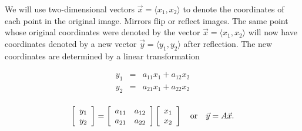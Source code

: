 We will use two-dimensional vectors $\vec x = \langle{x_1, x_2}\rangle$ to denote the coordinates of each point in the original image.  Mirrors flip or reflect images.  The same point whose original coordinates were denoted by the vector $\vec x = \langle{x_1, x_2}\rangle$ will now have coordinates denoted by a new vector $\vec y = \langle{y_1, y_2}\rangle$ after reflection.  
The new coordinates are determined by a linear transformation

\begin{eqnarray*}
y_1 &=& a_{11} x_1 + a_{12} x_2\\
y_2 &=& a_{21} x_1 + a_{22} x_2\\
\end{eqnarray*}

$$\left[{\begin{array}{c} y_1 \\ y_2 \\ \end{array}}\right] = \left[{\begin{array}{cc} a_{11} & a_{12} \\ a_{21} & a_{22} \\ \end{array}}\right] \left[{\begin{array}{c} x_1 \\ x_2 \\ \end{array}}\right]
\quad {\rm or} \quad \vec y = A \vec x.$$

\newpage

